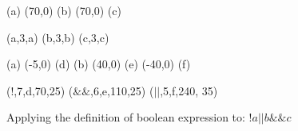 




\begin {figure}
\Draw



\MarkLoc(a)
\Move(70,0)
\MarkLoc(b)
\Move(70,0)
\MarkLoc(c)

\boxItDefault(a,3,a)
\boxItDefault(b,3,b)
\boxItDefault(c,3,c)

\MoveToLoc(a)
\Move(-5,0)
\MarkLoc(d)
\MoveToLoc(b)
\Move(40,0)
\MarkLoc(e)
\Move(-40,0)
\MarkLoc(f)

\boxIt($!$,7,d,70,25)
\boxIt($\&\&$,6,e,110,25)
\boxIt(\hspace{20pt}$||$\hspace{85pt},5,f,240, 35)

\EndDraw

\caption {Applying the definition of boolean expression to: 
$!a ||   b \&\& c $ 		%
}

\label {fig:boolExprAmb1}

\end {figure}


